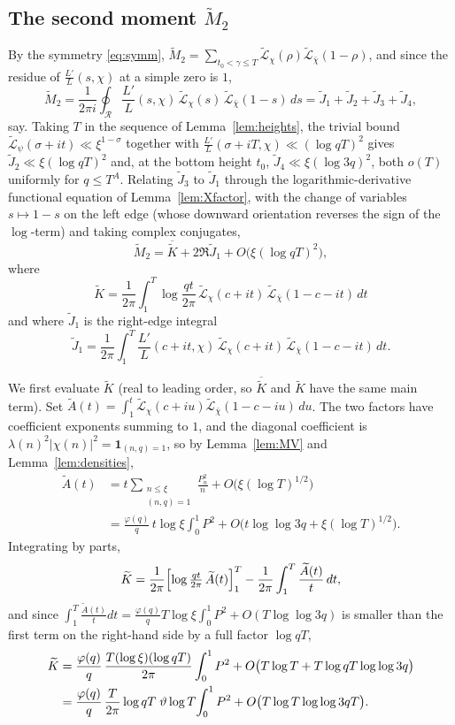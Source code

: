 \documentclass[12pt,a4paper,reqno]{amsart}
\theoremstyle{remark}
\numberwithin{equation}{section}
\begin{document}
\subsection{The second moment $\widetilde M_2$}
By the symmetry \eqref{eq:symm}, $\widetilde M_2=\sum_{t_0<\gamma\le T}\widetilde{\mathcal L}_\chi(\rho)\widetilde{\mathcal L}_{\bar\chi}(1-\rho)$, and since the residue of $\frac{L'}{L}(s,\chi)$ at a simple zero is $1$,
\[
\widetilde M_2=\frac{1}{2\pi i}\oint_{\mathcal R}\frac{L'}{L}(s,\chi)\,\widetilde{\mathcal L}_\chi(s)\,\widetilde{\mathcal L}_{\bar\chi}(1-s)\,ds=\widetilde J_1+\widetilde J_2+\widetilde J_3+\widetilde J_4,
\]
say. Taking $T$ in the sequence of Lemma~\ref{lem:heights}, the trivial bound $\widetilde{\mathcal L}_\psi(\sigma+it)\ll\xi^{1-\sigma}$ together with $\frac{L'}{L}(\sigma+iT,\chi)\ll(\log qT)^2$ gives $\widetilde J_2\ll\xi(\log qT)^2$ and, at the bottom height $t_0$, $\widetilde J_4\ll\xi(\log 3q)^2$, both $o(T)$ uniformly for $q\le T^{A}$. Relating $\widetilde J_3$ to $\widetilde J_1$ through the logarithmic-derivative functional equation of Lemma~\ref{lem:Xfactor}, with the change of variables $s\mapsto1-s$ on the left edge (whose downward orientation reverses the sign of the $\log$-term) and taking complex conjugates,
\[
\widetilde M_2=\overline{\widetilde K}+2\Re\widetilde J_1+O\bigl(\xi(\log qT)^2\bigr),
\]
where
\[
\widetilde K=\frac{1}{2\pi}\int_1^T\log\frac{qt}{2\pi}\,\widetilde{\mathcal L}_\chi(c+it)\,\widetilde{\mathcal L}_{\bar\chi}(1-c-it)\,dt
\]
and where $\widetilde J_1$ is the right-edge integral
\[
\widetilde J_1=\frac{1}{2\pi}\int_1^T\frac{L'}{L}(c+it,\chi)\,\widetilde{\mathcal L}_\chi(c+it)\,\widetilde{\mathcal L}_{\bar\chi}(1-c-it)\,dt .
\]

We first evaluate $\widetilde K$ (real to leading order, so $\overline{\widetilde K}$ and $\widetilde K$ have the same main term). Set $\widetilde A(t)=\int_1^t\widetilde{\mathcal L}_\chi(c+iu)\widetilde{\mathcal L}_{\bar\chi}(1-c-iu)\,du$. The two factors have coefficient exponents summing to $1$, and the diagonal coefficient is $\lambda(n)^2|\chi(n)|^2=\mathbf 1_{(n,q)=1}$, so by Lemma~\ref{lem:MV} and Lemma~\ref{lem:densities},
\[
\begin{aligned}
\widetilde A(t)&=t\sum_{\substack{n\le\xi\\(n,q)=1}}\frac{P_n^2}{n}+O\bigl(\xi(\log T)^{1/2}\bigr)\\
&=\frac{\varphi(q)}{q}\,t\log\xi\int_0^1 P^2+O\bigl(t\log\log 3q+\xi(\log T)^{1/2}\bigr).
\end{aligned}
\]
Integrating by parts,
\[
\widetilde K=\frac{1}{2\pi}\Bigl[\log\tfrac{qt}{2\pi}\,\widetilde A(t)\Bigr]_1^T-\frac{1}{2\pi}\int_1^T\frac{\widetilde A(t)}{t}\,dt,
\]
and since $\int_1^T\frac{\widetilde A(t)}{t}dt=\tfrac{\varphi(q)}{q}T\log\xi\int_0^1 P^2+O(T\log\log 3q)$ is smaller than the first term on the right-hand side by a full factor $\log qT$,
\begin{align}
\widetilde K&=\frac{\varphi(q)}{q}\,\frac{T(\log\xi)(\log qT)}{2\pi}\int_0^1 P^2+O\bigl(T\log T+T\log qT\log\log 3q\bigr)\notag\\
&=\frac{\varphi(q)}{q}\,\frac{T}{2\pi}\log qT\;\vartheta\log T\!\int_0^1 P^2+O\bigl(T\log T\log\log 3qT\bigr).\label{eq:K-Ng}
\end{align}
\end{document}
